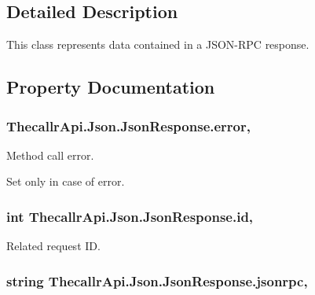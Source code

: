 \subsection{Detailed Description}
This class represents data contained in a J\+S\+O\+N-\/\+R\+P\+C response. 



\subsection{Property Documentation}
\hypertarget{class_thecallr_api_1_1_json_1_1_json_response_aff2a4d7e08a310c009d90f7d9278f179}{
\subsubsection[{error}]{ Thecallr\+Api.\+Json.\+Json\+Response.\+error\hspace{0.3cm}{\ttfamily [get]}, {\ttfamily [set]}}}\label{class_thecallr_api_1_1_json_1_1_json_response_aff2a4d7e08a310c009d90f7d9278f179}


Method call error. 

Set only in case of error.\hypertarget{class_thecallr_api_1_1_json_1_1_json_response_a234bb72dabad32bff0d92a4f391d8e94}{
\subsubsection[{id}]{\setlength{\rightskip}{0pt plus 5cm}int Thecallr\+Api.\+Json.\+Json\+Response.\+id\hspace{0.3cm}{\ttfamily [get]}, {\ttfamily [set]}}}\label{class_thecallr_api_1_1_json_1_1_json_response_a234bb72dabad32bff0d92a4f391d8e94}


Related request I\+D. 

\hypertarget{class_thecallr_api_1_1_json_1_1_json_response_a37a1a8e1a7317edcd56456911cd72cbf}{
\subsubsection[{jsonrpc}]{\setlength{\rightskip}{0pt plus 5cm}string Thecallr\+Api.\+Json.\+Json\+Response.\+jsonrpc\hspace{0.3cm}{\ttfamily [get]}, {\ttfamily [set]}}}\label{class_thecallr_api_1_1_json_1_1_json_response_a37a1a8e1a7317edcd56456911cd72cbf}


